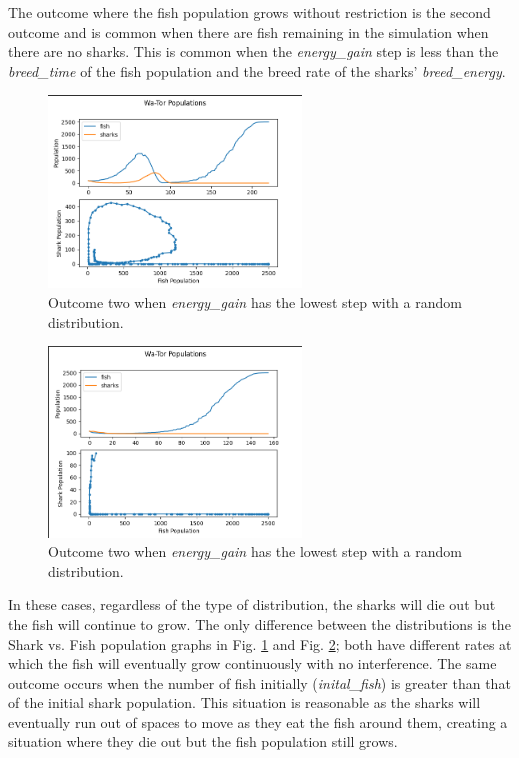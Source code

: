 \documentclass[12pt]{iopart} %
\begin{document}
The outcome where the fish population grows without restriction is the second outcome and is common when there are fish remaining in the simulation when there are no sharks. 
This is common when the \emph{energy\_gain} step is less than the \emph{breed\_time} of the fish population and the breed rate of the sharks' \emph{breed\_energy}.

\begin{figure}[h!tbp]
  \begin{center}
  \item[]\includegraphics[width=0.6\textwidth]{figure4.png}
  \caption{\label{fig:figure4}
  Outcome two when \emph{energy\_gain} has the lowest step with a random distribution.
  }
  \end{center}
\end{figure}

\begin{figure}[h!tbp]
  \begin{center}
  \item[]\includegraphics[width=0.6\textwidth]{figure5.png}
  \caption{\label{fig:figure5}
  Outcome two when \emph{energy\_gain} has the lowest step with a random distribution.
  }
  \end{center}
\end{figure}

In these cases, regardless of the type of distribution, the sharks will die out but the fish will continue to grow. 
The only difference between the distributions is the Shark vs. Fish population graphs in Fig. \ref{fig:figure4} and Fig. \ref{fig:figure5}; both have different rates at which the fish will eventually grow continuously with no interference. 
The same outcome occurs when the number of fish initially (\emph{inital\_fish}) is greater than that of the initial shark population. 
This situation is reasonable as the sharks will eventually run out of spaces to move as they eat the fish around them, creating a situation where they die out but the fish population still grows.
\end{document}
